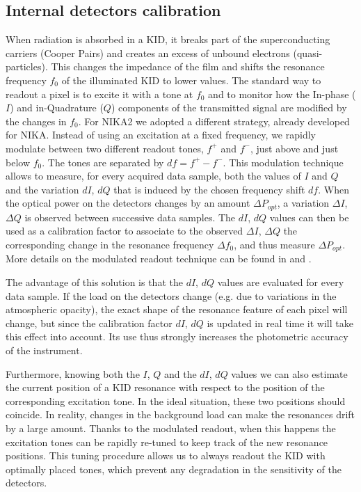 \documentclass[]{aa} %
\begin{document}
\subsection{Internal detectors calibration}
\label{Internal detectors calibration}
When radiation is absorbed in a KID, it breaks part of the superconducting carriers (Cooper Pairs) and creates an excess of unbound electrons (quasi-particles). This changes the impedance of the film and shifts the resonance frequency $f_0$ of the illuminated KID to lower values.
The standard way to readout a pixel is to excite it with a tone at $f_0$ and to monitor how the In-phase ($I$) and in-Quadrature ($Q$) components of the transmitted signal are modified by the changes in $f_0$. For NIKA2 we adopted a different strategy, already developed for NIKA. Instead of using an excitation at a fixed frequency, we rapidly modulate between two different readout tones, $f^+$ and $f^-$, just above and just below $f_0$. The tones are separated by $df=f^+-f^-$. This modulation technique allows to measure, for every acquired data sample, both the values of $I$ and $Q$ and the variation $dI$, $dQ$ that is induced by the chosen frequency shift $df$. When the optical power on the detectors changes by an amount $\Delta P_{opt}$, a variation $\Delta I$, $\Delta Q$ is observed between successive data samples. The $dI$, $dQ$ values can then be used as a calibration factor to associate to the observed $\Delta I$, $\Delta Q$ the corresponding change in the resonance frequency $\Delta f_0$, and thus measure $\Delta P_{opt}$. More details on the modulated readout technique can be found in \cite{Calvo2013} and \cite{Catalano2014}.

The advantage of this solution is that the $dI$, $dQ$ values are evaluated for every data sample. If the load on the detectors change (e.g. due to variations in the atmospheric opacity), the exact shape of the resonance feature of each pixel will change, but since the calibration factor $dI$, $dQ$ is updated in real time it will take this effect into account. Its use thus strongly increases the photometric accuracy of the instrument.

Furthermore, knowing both the $I$, $Q$ and the $dI$, $dQ$ values we can also estimate the current position of a KID resonance with respect to the position of the corresponding excitation tone. In the ideal situation, these two positions should coincide. In reality, changes in the background load can make the resonances drift by a large amount. Thanks to the modulated readout, when this happens the excitation tones can be rapidly re-tuned to keep track of the new resonance positions. This tuning procedure allows us to always readout the KID with optimally placed tones, which prevent any degradation in the sensitivity of the detectors.
\end{document}
